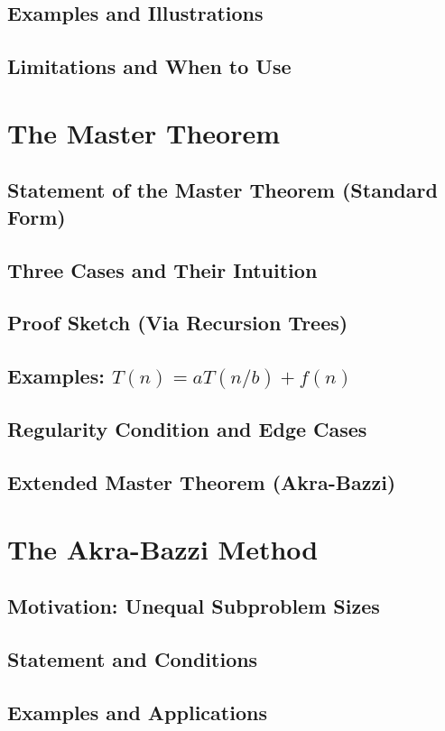 \subsection{Examples and Illustrations}
\subsection{Limitations and When to Use}

\section{The Master Theorem}
\subsection{Statement of the Master Theorem (Standard Form)}
\subsection{Three Cases and Their Intuition}
\subsection{Proof Sketch (Via Recursion Trees)}
\subsection{Examples: $T(n) = aT(n/b) + f(n)$}
\subsection{Regularity Condition and Edge Cases}
\subsection{Extended Master Theorem (Akra-Bazzi)}

\section{The Akra-Bazzi Method}
\subsection{Motivation: Unequal Subproblem Sizes}
\subsection{Statement and Conditions}
\subsection{Examples and Applications}
